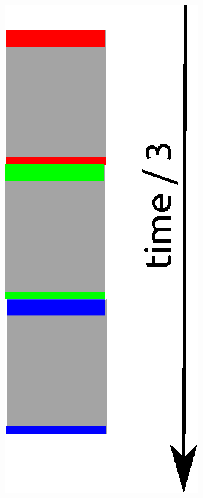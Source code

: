 \documentclass[aspectratio=169]{beamer}
\begin{document}
\begin{frame}[fragile]
\begin{columns}
    \begin{column}{.18\textwidth}
      \includegraphics[scale=0.6]{img/part1_2_sequence.eps}
    \end{column}
  \end{columns}
\end{frame}
\end{document}

